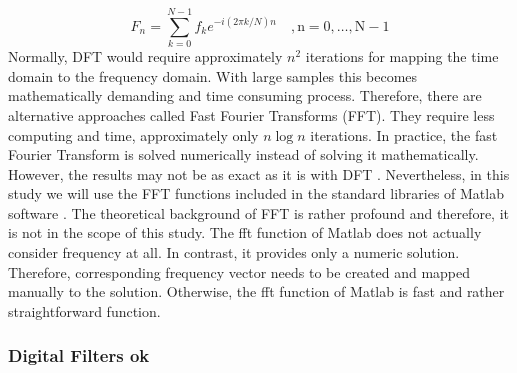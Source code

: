 \documentclass[english,12pt,a4paper,pdftex,elec,utf8]{aaltothesis}
\begin{document}
\begin{equation} \label{fftequation}
F_n =  \sum \limits^{N-1}_{k=0} f_k e^{-i(2\pi k / N) n} \mathrm{\hspace{1em} , n = 0, \dots , N -1} 
\end{equation} 
Normally, DFT would require approximately $n^2$ iterations for mapping the time domain to the frequency domain. With large samples this becomes mathematically demanding and time consuming process. Therefore, there are alternative approaches called Fast Fourier Transforms (FFT). They require less computing and time, approximately only $n \log n$ iterations. In practice, the fast Fourier Transform is solved numerically instead of solving it mathematically. However, the results may not be as exact as it is with DFT \cite{khan2005digital} \cite{rao2012fast}. Nevertheless, in this study we will use the FFT functions included in the standard libraries of Matlab software \cite{matlabfft}. The theoretical background of FFT is rather profound and therefore, it is not in the scope of this study. The fft function of Matlab does not actually consider frequency at all. In contrast, it provides only a numeric solution. Therefore, corresponding frequency vector needs to be created and mapped manually to the solution. Otherwise, the fft function of Matlab is fast and rather straightforward function.






\subsubsection{Digital Filters ok} \label{digitalfilterssection}
\end{document}
